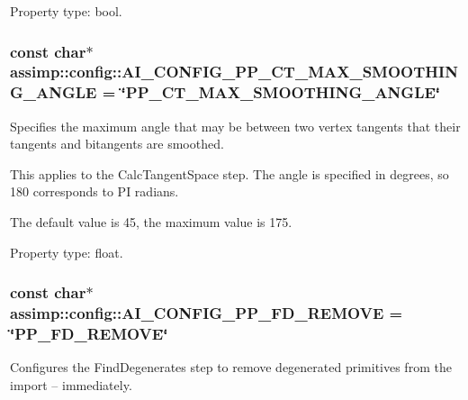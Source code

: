 Property type\+: bool. \hypertarget{namespaceassimp_1_1config_a78b5b65f3076ed1f8c59a3596df26439}{
\subsubsection[{A\+I\+\_\+\+C\+O\+N\+F\+I\+G\+\_\+\+P\+P\+\_\+\+C\+T\+\_\+\+M\+A\+X\+\_\+\+S\+M\+O\+O\+T\+H\+I\+N\+G\+\_\+\+A\+N\+G\+L\+E}]{\setlength{\rightskip}{0pt plus 5cm}const char$\ast$ assimp\+::config\+::\+A\+I\+\_\+\+C\+O\+N\+F\+I\+G\+\_\+\+P\+P\+\_\+\+C\+T\+\_\+\+M\+A\+X\+\_\+\+S\+M\+O\+O\+T\+H\+I\+N\+G\+\_\+\+A\+N\+G\+L\+E = \char`\"{}P\+P\+\_\+\+C\+T\+\_\+\+M\+A\+X\+\_\+\+S\+M\+O\+O\+T\+H\+I\+N\+G\+\_\+\+A\+N\+G\+L\+E\char`\"{}}}\label{namespaceassimp_1_1config_a78b5b65f3076ed1f8c59a3596df26439}
Specifies the maximum angle that may be between two vertex tangents that their tangents and bitangents are smoothed.

This applies to the {\ttfamily Calc\+Tangent\+Space} step. The angle is specified in degrees, so 180 corresponds to P\+I radians.

The default value is 45, the maximum value is 175.

Property type\+: float. \hypertarget{namespaceassimp_1_1config_a34bf9b73bdd068bf96483e54fde9fc79}{
\subsubsection[{A\+I\+\_\+\+C\+O\+N\+F\+I\+G\+\_\+\+P\+P\+\_\+\+F\+D\+\_\+\+R\+E\+M\+O\+V\+E}]{\setlength{\rightskip}{0pt plus 5cm}const char$\ast$ assimp\+::config\+::\+A\+I\+\_\+\+C\+O\+N\+F\+I\+G\+\_\+\+P\+P\+\_\+\+F\+D\+\_\+\+R\+E\+M\+O\+V\+E = \char`\"{}P\+P\+\_\+\+F\+D\+\_\+\+R\+E\+M\+O\+V\+E\char`\"{}}}\label{namespaceassimp_1_1config_a34bf9b73bdd068bf96483e54fde9fc79}
Configures the {\ttfamily Find\+Degenerates} step to remove degenerated primitives from the import – immediately.

